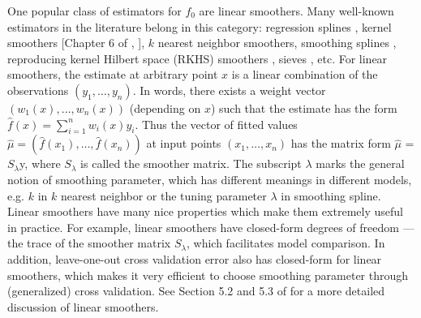 \documentclass[a4paper]{article}
\begin{document}
One popular class of estimators for $f_0$ are linear smoothers. Many well-known estimators in the literature belong in this category: regression splines \cite{carl1978practical}, kernel smoothers [Chapter 6 of \cite{friedman2001elements}, \cite{loader2006local}], $k$ nearest neighbor smoothers, smoothing splines \cite{carl1978practical,wahba1990spline,green1993nonparametric}, reproducing kernel Hilbert space (RKHS) smoothers \cite{smola1998learning,wahba1990spline}, sieves \cite{shen1994convergence,wong1995probability}, etc.  For linear smoothers, the estimate at arbitrary point $x$ is a linear combination of the observations $(y_1,\ldots, y_n)$. In words, there exists a weight vector $(w_1(x), \ldots, w_n(x))$ (depending on $x$) such that the estimate has the form $\hat{f}(x) = \sum_{i=1}^n w_i(x)y_i$. Thus the vector of fitted values $\hat{\mu} = (\hat{f}(x_1), \ldots, \hat{f}(x_n))$ at input points $(x_1, \ldots, x_n)$ has the matrix form $\hat{\mu}$ = $S_\lambda$y, where $S_\lambda$ is called the smoother matrix. The subscript $\lambda$ marks the general notion of smoothing parameter, which has different meanings in different models, e.g. $k$ in $k$ nearest neighbor or the tuning parameter $\lambda$ in smoothing spline. Linear smoothers have many nice properties which make them extremely useful in practice. For example, linear smoothers have closed-form degrees of freedom \cite{efron1986biased}---the trace of the smoother matrix $S_\lambda$, which facilitates model comparison. In addition, leave-one-out cross validation error also has closed-form for linear smoothers, which makes it very efficient to choose smoothing parameter through (generalized) cross validation. See Section 5.2 and 5.3 of \cite{wasserman2007all} for a more detailed discussion of linear smoothers.
\end{document}
